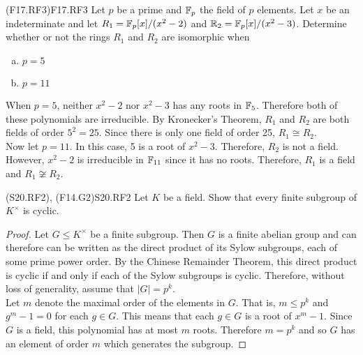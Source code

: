 \documentclass[../AlgebraQualSolutions.tex]{subfiles}
\begin{document}
\begin{prob}{(F17.RF3)}{F17.RF3}
    Let $p$ be a prime and $\mathbb{F}_p$ the field of $p$ elements. Let $x$ be an indeterminate and let $R_1 = \mathbb{F}_p[x]/(x^2 - 2)$ and $\mathbb{R}_2 = \mathbb{F}_p[x]/(x^2 - 3)$. Determine whether or not the rings $R_1$ and $R_2$ are isomorphic when
    \begin{enumerate}[(a)]
        \item $p = 5$
        \item $p = 11$
    \end{enumerate}
\end{prob}


\begin{solution}
When $p = 5$, neither $x^2 - 2$ nor $x^2 - 3$ has any roots in $\mathbb{F}_5$. Therefore both of these polynomials are irreducible. By Kronecker's Theorem, $R_1$ and $R_2$ are both fields of order $5^2 = 25$. Since there is only one field of order 25, $R_1 \cong R_2$.\\

Now let $p = 11$. In this case, 5 is a root of $x^2 - 3$. Therefore, $R_2$ is not a field. However, $x^2 - 2$ is irreducible in $\mathbb{F}_{11}$ since it has no roots. Therefore, $R_1$ is a field and $R_1 \not\cong R_2$.
\end{solution}

\begin{prob}{(S20.RF2), (F14.G2)}{S20.RF2}
Let $K$ be a field. Show that every finite subgroup of $K^\times$ is cyclic.
\end{prob}

\begin{proof}
	Let $G \leq K^\times$ be a finite subgroup. Then $G$ is a finite abelian group and can therefore can be written as the direct product of its Sylow subgroups, each of some prime power order. By the Chinese Remainder Theorem, this direct product is cyclic if and only if each of the Sylow subgroups is cyclic. Therefore, without loss of generality, assume that $|G| = p^k$.\\

	Let $m$ denote the maximal order of the elements in $G$. That is, $m \leq p^k$ and $g^m - 1 = 0$ for each $g \in G$. This  means that each $g \in G$ is a root of $x^m - 1$. Since $G$ is a field, this polynomial has at most $m$ roots. Therefore $m = p^k$ and so $G$ has an element of order $m$ which generates the subgroup.
\end{proof}
\end{document}
